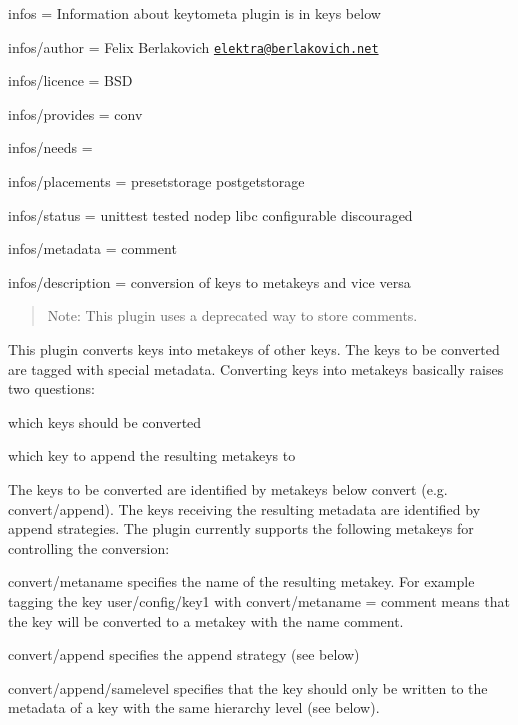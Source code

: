 
\begin{DoxyItemize}
\item infos = Information about keytometa plugin is in keys below
\item infos/author = Felix Berlakovich \href{mailto:elektra@berlakovich.net}{\tt elektra@berlakovich.\+net}
\item infos/licence = B\+SD
\item infos/provides = conv
\item infos/needs =
\item infos/placements = presetstorage postgetstorage
\item infos/status = unittest tested nodep libc configurable discouraged
\item infos/metadata = comment
\item infos/description = conversion of keys to metakeys and vice versa
\end{DoxyItemize}

\begin{quote}
Note\+: This plugin uses a deprecated way to store comments. \end{quote}


This plugin converts keys into metakeys of other keys. The keys to be converted are tagged with special metadata. Converting keys into metakeys basically raises two questions\+:


\begin{DoxyItemize}
\item which keys should be converted
\item which key to append the resulting metakeys to
\end{DoxyItemize}

The keys to be converted are identified by metakeys below {\ttfamily convert} (e.\+g. {\ttfamily convert/append}). The keys receiving the resulting metadata are identified by append strategies. The plugin currently supports the following metakeys for controlling the conversion\+:


\begin{DoxyItemize}
\item {\ttfamily convert/metaname} specifies the name of the resulting metakey. For example tagging the key {\ttfamily user/config/key1} with {\ttfamily convert/metaname = comment} means that the key will be converted to a metakey with the name {\ttfamily comment}.
\item {\ttfamily convert/append} specifies the append strategy (see below)
\item {\ttfamily convert/append/samelevel} specifies that the key should only be written to the metadata of a key with the same hierarchy level (see below).
\end{DoxyItemize}

